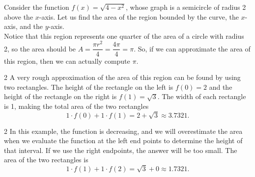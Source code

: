 \documentclass{book}
\begin{document}
\begin{Exam}\label{exam:area:cirlce} Consider the function $f(x) = \sqrt{4-x^2}$, whose graph is a semicircle of radius 2 above the $x$-axis. Let us find the area of the region bounded by the curve, the $x$-axis, and the $y$-axis.\\

Notice that this region represents one quarter of the area of a circle with radius 2, so the area should be $A = \dfrac{\pi r^2}{4} = \dfrac{4\pi}{4} = \pi$. So, if we can approximate the area of this region, then we can actually compute $\pi$.

\begin{multicols}{2}
 A very rough approximation of the area of this region can be found by using two rectangles.  The height of the rectangle on the left is $f(0) = 2$ and the height of the rectangle on the right is $f(1) = \sqrt{3}$. The width of each rectangle is 1, making the total area of the two rectangles \[1\cdot f(0) + 1\cdot f(1) = 2 + \sqrt{3} \approx 3.7321.\] \vfill
 \begin{center}
\end{center}
\end{multicols}

\begin{multicols}{2}
In this example, the function is decreasing, and we will overestimate the area when we evaluate the function at the left end points to determine the height of that interval. If we use the right endpoints, the answer will be too small. The area of the two rectangles is \[1\cdot f(1) + 1\cdot f(2) = \sqrt{3} + 0 \approx 1.7321.\]\vfill
\begin{center}
\end{center}
\end{multicols}


\end{Exam}
\end{document}
